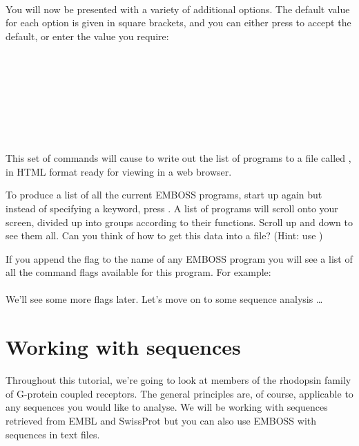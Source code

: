 \documentclass[12pt]{report}
\begin{document}
\unix{}\\

You will now be presented with a variety of additional options. The
default value for each option is given in square brackets, and you can
either press  to accept the default, or enter the
value you require:\\

 \\
 \\
 \\
 \\
 \\
\\
\\
\\

This set of commands will cause  to write out the
list of programs to a file called , in HTML format
ready for viewing in a web browser.

To produce a list of all the current EMBOSS programs, start up
 again but instead of specifying a keyword, 
press . A list of programs will scroll onto your screen,
divided up into groups according to their functions. Scroll up and
down to see them all. Can you think of how to get this data into a
file? (Hint: use )

If you append the flag  to the name of any EMBOSS program
you will see a list of all the command flags available for this
program. For example:\\

\unix{}\\

We'll see some more flags later. Let's move on to some sequence analysis \dots

\chapter{Working with sequences}
\label{chap:seqret}
Throughout this tutorial, we're going to look at members of the
rhodopsin family of G-protein coupled receptors. The general
principles are, of course, applicable to any sequences you would like
to analyse. We will be working with sequences retrieved from EMBL and
SwissProt but you can also use EMBOSS with sequences in text
files.
\end{document}
